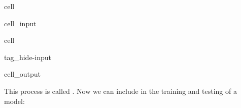 \documentclass[letterpaper,10pt,english]{jupyterBook}
\begin{document}
\begin{sphinxuseclass}{cell}\begin{sphinxVerbatimInput}

\begin{sphinxuseclass}{cell_input}
\begin{sphinxVerbatim}[commandchars=\\\{\}]
  
\end{sphinxVerbatim}

\end{sphinxuseclass}\end{sphinxVerbatimInput}

\end{sphinxuseclass}
\begin{sphinxuseclass}{cell}
\begin{sphinxuseclass}{tag_hide-input}\begin{sphinxVerbatimOutput}

\begin{sphinxuseclass}{cell_output}
\end{sphinxuseclass}\end{sphinxVerbatimOutput}

\end{sphinxuseclass}
\end{sphinxuseclass}
\sphinxAtStartPar
This process is called . Now we can include  in the training and testing of a model:
\end{document}
